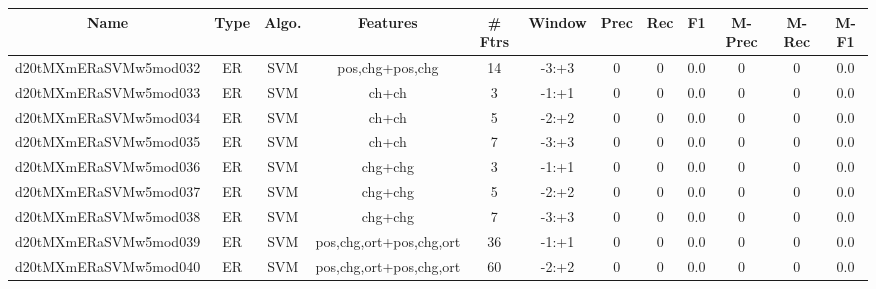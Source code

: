 \documentclass[a4paper]{article}
\begin{document}
\begin{landscape}
\begin{center}
\begin{tabular}{ |c|c|c|c|c|c|c|c|c|c|c|c|}
 \hline
\end{tabular}
\end{center}




\begin{center}
\begin{tabular}{ |c|c|c|c|c|c|c|c|c|c|c|c|} 
 \hline
 	Name & Type & Algo. & Features & \# Ftrs & Window & Prec & Rec & F1 & M-Prec & M-Rec & M-F1\\
 \hline

 	

 
 	
 	\small{ d20tMXmERaSVMw5mod032 } & ER & SVM & pos,chg+pos,chg  &  14 &  -3:+3  &  0 & 0 & 0.0  &  0 & 0 & 0.0 \\
 	

 
 	
 	\small{ d20tMXmERaSVMw5mod033 } & ER & SVM & ch+ch  &  3 &  -1:+1  &  0 & 0 & 0.0  &  0 & 0 & 0.0 \\
 	

 
 	
 	\small{ d20tMXmERaSVMw5mod034 } & ER & SVM & ch+ch  &  5 &  -2:+2  &  0 & 0 & 0.0  &  0 & 0 & 0.0 \\
 	

 
 	
 	\small{ d20tMXmERaSVMw5mod035 } & ER & SVM & ch+ch  &  7 &  -3:+3  &  0 & 0 & 0.0  &  0 & 0 & 0.0 \\
 	

 
 	
 	\small{ d20tMXmERaSVMw5mod036 } & ER & SVM & chg+chg  &  3 &  -1:+1  &  0 & 0 & 0.0  &  0 & 0 & 0.0 \\
 	

 
 	
 	\small{ d20tMXmERaSVMw5mod037 } & ER & SVM & chg+chg  &  5 &  -2:+2  &  0 & 0 & 0.0  &  0 & 0 & 0.0 \\
 	

 
 	
 	\small{ d20tMXmERaSVMw5mod038 } & ER & SVM & chg+chg  &  7 &  -3:+3  &  0 & 0 & 0.0  &  0 & 0 & 0.0 \\
 	

 
 	
 	\small{ d20tMXmERaSVMw5mod039 } & ER & SVM & pos,chg,ort+pos,chg,ort  &  36 &  -1:+1  &  0 & 0 & 0.0  &  0 & 0 & 0.0 \\
 	

 
 	
 	\small{ d20tMXmERaSVMw5mod040 } & ER & SVM & pos,chg,ort+pos,chg,ort  &  60 &  -2:+2  &  0 & 0 & 0.0  &  0 & 0 & 0.0 \\
 	


\end{tabular}
\end{center}
\end{landscape}
\end{document}
